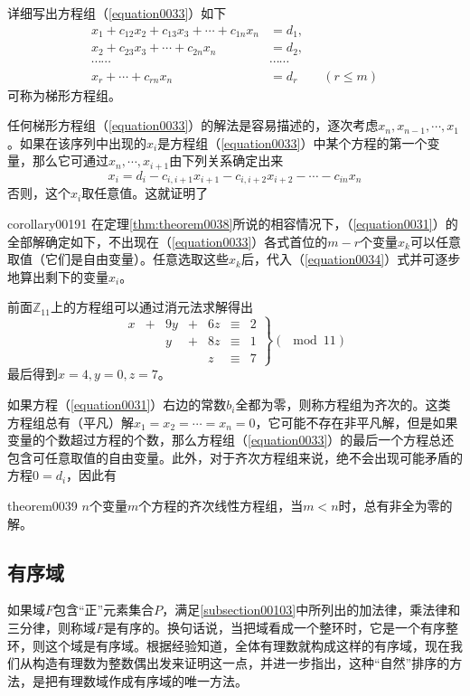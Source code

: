 详细写出方程组（\ref{equation0033}）如下
\begin{equation}\label{equation0034}
\begin{aligned}
x_1+c_{12}x_2+c_{13}x_3+\cdots+c_{1n}x_n&=d_1,\\
x_2+c_{23}x_3+\cdots+c_{2n}x_n&=d_2,\\
\cdots\cdots&\cdots\cdots\\
x_r+\cdots+c_{rn}x_n&=d_r\qquad(r \le m)
\end{aligned}
\end{equation}
可称为梯形方程组。

任何梯形方程组（\ref{equation0033}）的解法是容易描述的，逐次考虑$x_{n}, x_{n-1}, \cdots, x_1$。如果在该序列中出现的$x_i$是方程组（\ref{equation0033}）中某个方程的第一个变量，那么它可通过$x_n,\cdots, x_{i+1}$由下列关系确定出来
\[
x_i = d_i - c_{i,i+1}x_{i+1}-c_{i,i+2}x_{i+2}-\cdots-c_{in}x_n
\]
否则，这个$x_i$取任意值。这就证明了
\begin{corollary}{}{corollary00191}
在定理\ref{thm:theorem0038}所说的相容情况下，（\ref{equation0031}）的全部解确定如下，不出现在（\ref{equation0033}）各式首位的$m-r$个变量$x_k$可以任意取值（它们是自由变量）。任意选取这些$x_k$后，代入（\ref{equation0034}）式并可逐步地算出剩下的变量$x_i$。
\end{corollary}

前面$\mathbb{Z}_11$上的方程组可以通过消元法求解得出
\[
\left.
\begin{array}{rcrcrcl}
x&+&9y&+&6z&\equiv&2\\
&&y&+&8z&\equiv&1\\
&&&&z&\equiv&7
\end{array}
\right\}(\mod{11})
\]
最后得到$x=4,y=0,z=7$。


如果方程（\ref{equation0031}）右边的常数$b_i$全都为零，则称方程组为齐次的。这类方程组总有（平凡）解$x_1=x_2=\cdots=x_n=0$，它可能不存在非平凡解，但是如果变量的个数超过方程的个数，那么方程组（\ref{equation0033}）的最后一个方程总还包含可任意取值的自由变量。此外，对于齐次方程组来说，绝不会出现可能矛盾的方程$0=d_i$，因此有
\begin{theorem}{}{theorem0039}
$n$个变量$m$个方程的齐次线性方程组，当$m < n$时，总有非全为零的解。
\end{theorem}

\subsection{有序域}
如果域$F$包含“正”元素集合$P$，满足\ref{subsection00103}中所列出的加法律，乘法律和三分律，则称域$F$是有序的。换句话说，当把域看成一个整环时，它是一个有序整环，则这个域是有序域。根据经验知道，全体有理数就构成这样的有序域，现在我们从构造有理数为整数偶出发来证明这一点，并进一步指出，这种“自然”排序的方法，是把有理数域作成有序域的唯一方法。

